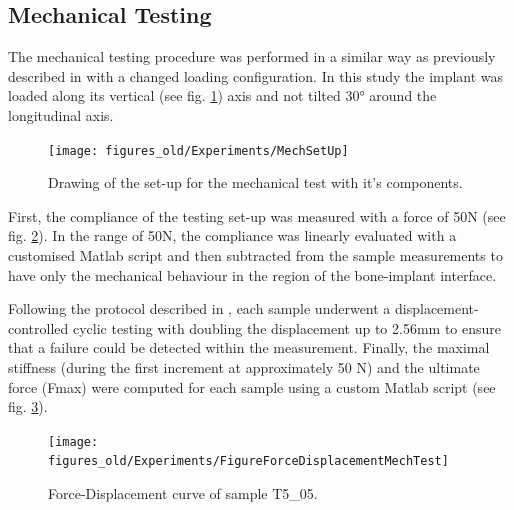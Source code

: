 \documentclass[12pt, a4paper, twoside]{report}
\begin{document}
\subsection{Mechanical Testing}
%
The mechanical testing procedure was performed in a similar way as previously described in \cite{Voumard2015} with a changed loading configuration. In this study the implant was loaded along its vertical (see fig. \ref{fig:MechSetUp}) axis and not tilted 30° around the longitudinal axis.
\begin{figure}[H]
  \centering
      \texttt{[image: figures\_old/Experiments/MechSetUp]}
  \caption{Drawing of the set-up for the mechanical test with it's components.}
  \label{fig:MechSetUp}
\end{figure} 
 
First, the compliance of the testing set-up was measured with a force of 50N (see fig. \ref{fig:FigureComplianceTest}). In the range of 50N, the compliance was linearly evaluated with a customised Matlab script and then subtracted from the sample measurements to have only the mechanical behaviour in the region of the bone-implant interface. 
\begin{figure}[H]
\centering
{}
\label{fig:FigureComplianceTest}
\end{figure}


%
Following the protocol described in \cite{Voumard2015}, each sample underwent a displacement-controlled cyclic testing with doubling the displacement up to 2.56mm to ensure that a failure could be detected within the measurement. Finally, the maximal stiffness (during the first increment at approximately 50 N) and the ultimate force (Fmax) were computed for each sample using a custom Matlab script (see fig.  \ref{fig:FigureForceDisplacementMechTest}).
%
%
\begin{figure}[H]
  \centering
      \texttt{[image: figures\_old/Experiments/FigureForceDisplacementMechTest]}
  \caption{Force-Displacement curve of sample T5\_05.}
  \label{fig:FigureForceDisplacementMechTest}
\end{figure}
%
%
\end{document}
